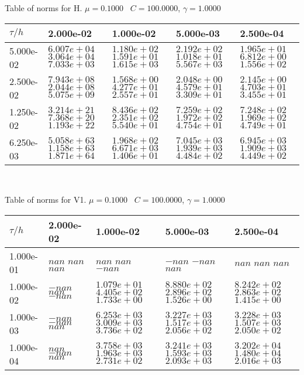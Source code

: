 \begin{center}
	Table of norms for H. $\mu = 0.1000$ \, $C = 100.0000$, $\gamma = 1.0000$
	
	\begin{tabular}{|p{1in}|p{1in}|p{1in}|p{1in}|p{1in}|} \hline
		$\tau / h$ &2.000e-02 &1.000e-02 &5.000e-03 &2.500e-04 \\ \hline 
		5.000e-02 & $6.007e+04$  $3.064e+04$  $7.033e+03$  & $1.180e+02$  $1.591e+01$  $1.615e+03$  & $2.192e+02$  $1.018e+01$  $5.567e+03$  & $1.965e+01$  $6.812e+00$  $1.556e+02$  \\ \hline 
		2.500e-02 & $7.943e+08$  $2.044e+08$  $5.075e+09$  & $1.568e+00$  $4.277e+01$  $2.557e+01$  & $2.048e+00$  $4.579e+01$  $3.309e+01$  & $2.145e+00$  $4.703e+01$  $3.455e+01$  \\ \hline 
		1.250e-02 & $3.214e+21$  $7.368e+20$  $1.193e+22$  & $8.436e+02$  $2.351e+02$  $5.540e+01$  & $7.259e+02$  $1.972e+02$  $4.754e+01$  & $7.248e+02$  $1.969e+02$  $4.749e+01$  \\ \hline 
		6.250e-03 & $5.058e+63$  $1.158e+63$  $1.871e+64$  & $1.968e+02$  $6.671e+03$  $1.406e+01$  & $7.045e+03$  $1.939e+03$  $4.484e+02$  & $6.945e+03$  $1.909e+03$  $4.449e+02$  \\ \hline 
		
	\end{tabular}\\[20pt]
\end{center}


\newpage
\begin{center}
	Table of norms for V1. $\mu = 0.1000$ \, $C = 100.0000$, $\gamma = 1.0000$
	
	\begin{tabular}{|p{1in}|p{1in}|p{1in}|p{1in}|p{1in}|} \hline
		$\tau / h$ &2.000e-02 &1.000e-02 &5.000e-03 &2.500e-04 \\ \hline 
		1.000e-01 & $nan$  $nan$  $nan$  & $nan$  $nan$  $-nan$  & $-nan$  $-nan$  $nan$  & $nan$  $nan$  $nan$  \\ \hline 
		1.000e-02 & $-nan$  $nan$  $-nan$  & $1.079e+01$  $4.405e+02$  $1.733e+00$  & $8.880e+02$  $2.896e+02$  $1.526e+00$  & $8.242e+02$  $2.863e+02$  $1.415e+00$  \\ \hline 
		1.000e-03 & $-nan$  $-nan$  $nan$  & $6.253e+03$  $3.009e+03$  $3.736e+02$  & $3.227e+03$  $1.517e+03$  $2.056e+02$  & $3.228e+03$  $1.507e+03$  $2.050e+02$  \\ \hline 
		1.000e-04 & $nan$  $-nan$  $nan$  & $3.758e+03$  $1.963e+03$  $2.731e+02$  & $3.241e+03$  $1.593e+03$  $2.093e+03$  & $3.202e+04$  $1.480e+04$  $2.016e+03$  \\ \hline 
		
	\end{tabular}\\[20pt]
\end{center}

